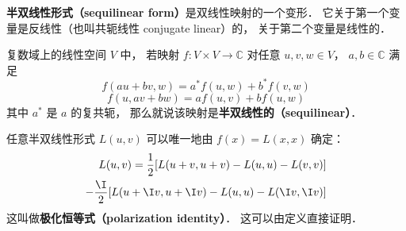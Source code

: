 
\begin{issues}
\issueDraft
\end{issues}

\textbf{半双线性形式（sequilinear form）}是双线性映射的一个变形． 它关于第一个变量是反线性（也叫共轭线性 conjugate linear）的， 关于第二个变量是线性的．
\begin{definition}{}
复数域上的线性空间 $V$ 中， 若映射 $f:V\times V\to \mathbb C$ 对任意 $u, v, w\in V$， $a,b\in \mathbb C$ 满足
\begin{equation}\label{sequil_eq2}
f(au+bv, w) = a^*f(u, w) + b^*f(v, w)
\end{equation}
\begin{equation}\label{sequil_eq1}
f(u, av+bw) = af(u, v) + bf(u, w)
\end{equation}
其中 $a^*$ 是 $a$ 的复共轭， 那么就说该映射是\textbf{半双线性的（sequilinear）}．
\end{definition}

任意半双线性形式 $L(u, v)$ 可以唯一地由 $f(x) = L(x, x)$ 确定：
\begin{equation}
\begin{aligned}
L(u, v) =\frac{1}{2}[L(u+v, u+v)-L(u, u)-L(v, v)]\\
-\frac{\I}{2}[L(u+\I v, u+\I v)-L(u, u)-L(\I v, \I v)]
\end{aligned}
\end{equation}
这叫做\textbf{极化恒等式（polarization identity）}． 这可以由定义直接证明．
